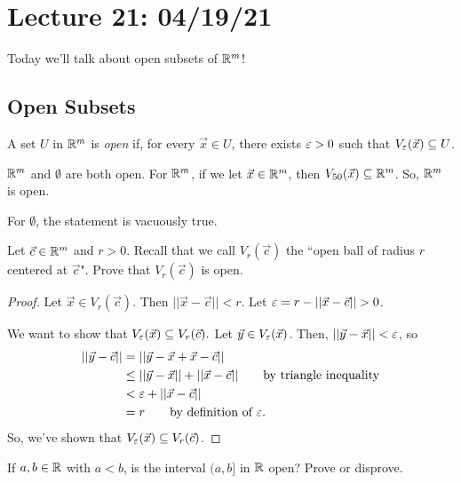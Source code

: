 \section{Lecture 21: 04/19/21}

Today we'll talk about open subsets of $\mathbb{R}^m$!

\subsection{Open Subsets}

\begin{definition}
A set $U$ in $\mathbb{R}^m$ is \textit{open} if, for every $\vec x \in U$, there exists $\varepsilon > 0$ such that $V_\varepsilon (\vec x) \subseteq U$.
\end{definition}

\begin{example}
$\mathbb{R}^m$ and $\emptyset$ are both open. 
For $\mathbb{R}^m$, if we let $\vec x\in \mathbb{R}^m$, then $V_{50}(\vec x) \subseteq \mathbb{R}^m$. So, $\mathbb{R}^m$ is open.

For $\emptyset$, the statement is vacuously true.
\end{example}

\begin{example}
Let $\vec c \in \mathbb{R}^m$ and $r > 0$. Recall that we call $V_r(\vec c)$ the ``open ball of radius $r$ centered at $\vec c$". Prove that $V_r(\vec c)$ is open.
\end{example}

\begin{proof}
Let $\vec x \in V_r(\vec c)$. Then $||\vec x - \vec c || < r$. Let $\varepsilon = r - ||\vec x - \vec c|| > 0$.

We want to show that $V_\varepsilon (\vec x) \subseteq V_r(\vec c).$ Let $\vec y \in V_{\varepsilon} (\vec x)$. Then, $||\vec y - \vec x|| < \varepsilon$, so 
\begin{align*}
    ||\vec y - \vec c|| &= ||\vec y - \vec x + \vec x - \vec c|| \\
    &\le ||\vec y - \vec x|| + ||\vec x - \vec c|| \qquad \text{by triangle inequality}\\
    &< \varepsilon + ||\vec x - \vec c|| \\
    &= r \qquad \text{by definition of $\varepsilon$.}
\end{align*}
So, we've shown that $V_\varepsilon(\vec x) \subseteq V_r(\vec c)$.

\end{proof}

\begin{example}
If $a, b \in \mathbb{R}$ with $a < b$, is the interval $(a, b]$ in $\mathbb{R}$ open? Prove or disprove.
\end{example}

